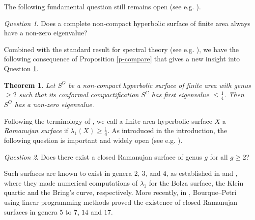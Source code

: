 \documentclass{amsart}
\theoremstyle{plain}
\newtheorem{theorem}{Theorem}[section]
\theoremstyle{definition}
\theoremstyle{remark}
\newtheorem{que}{Question}
\begin{document}
The following fundamental question still remains open (see e.g. \cite{Sar03}).
\begin{que}\label{in-q-1}
Does a complete non-compact hyperbolic surface of finite area always have a non-zero eigenvalue?
\end{que}

Combined with the standard result for spectral theory (see e.g. \cite[Theorem XIII.1]{RS-book}), we have the following consequence of Proposition \ref{p-compare} that gives a new insight into Question \ref{in-q-1}.
\begin{theorem}
Let $S^O$ be a non-compact hyperbolic surface of finite area with genus $\geq 2$ such that its conformal compactification $S^C$ has first eigenvalue $\leq \frac{1}{4}$. Then $S^O$ has  a non-zero eigenvalue.
\end{theorem}

Following the terminology of \cite{BP2023}, we call a finite-area hyperbolic surface $X$ a \emph{Ramanujan surface} if $\lambda_1(X) \geq \frac{1}{4}$.
As introduced in the introduction, the following question is important and widely open (see e.g. \cite{BP2023,Hand25}).
\begin{que}
Does there exist a closed Ramanujan surface of genus $g$ for all $g\geq 2$?
\end{que}
\noindent Such surfaces are known to exist in genera $2$, $3$, and $4$, as established in \cite{SU2013} and \cite{Cook2018}, where they made numerical computations of $\lambda_1$ for the Bolza surface, the Klein quartic and the Bring's curve, respectively. More recently, in \cite{BP2023}, Bourque--Petri using linear programming methods proved the existence of closed Ramanujan surfaces in genera $5$ to $7$, $14$ and $17$.
\end{document}
